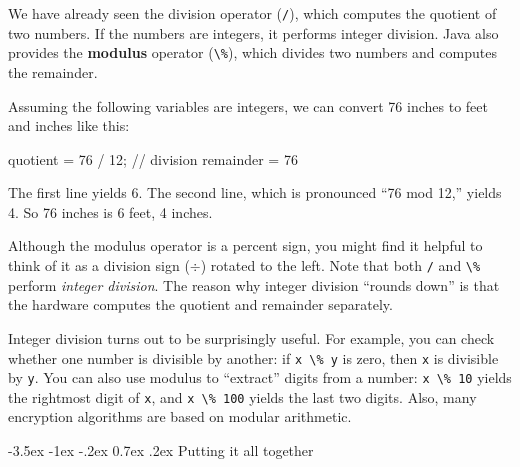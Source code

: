 \documentclass[12pt]{book}
\makeatletter
\theoremstyle{exercise}
\newcommand{\java}[1]{\verb"#1"}
\renewcommand{\section}{\@startsection {section}{1}{\z@}%
    {-3.5ex \@plus -1ex \@minus -.2ex}%
    {0.7ex \@plus.2ex}%
    {\normalfont\Large\bfseries}}
\newcommand{\java}[1]{\lstinline{#1}} %
\makeatother
\begin{document}
We have already seen the division operator (\java{/}), which computes the quotient of two numbers.
If the numbers are integers, it performs integer division.
Java also provides the {\bf modulus} operator (\java{\%}), which divides two numbers and computes the remainder.

Assuming the following variables are integers, we can convert 76 inches to feet and inches like this:

\begin{code}
    quotient = 76 / 12;   // division
    remainder = 76 %
\end{code}

The first line yields 6.
The second line, which is pronounced ``76 mod 12,'' yields 4.
So 76 inches is 6 feet, 4 inches.

Although the modulus operator is a percent sign, you might find it helpful to think of it as a division sign ($\div$) rotated to the left.
Note that both \java{/} and \java{\%} perform {\em integer division}.
The reason why integer division ``rounds down'' is that the hardware computes the quotient and remainder separately.


Integer division turns out to be surprisingly useful.
For example, you can check whether one number is divisible by another: if \java{x \% y} is zero, then \java{x} is divisible by \java{y}.
You can also use modulus to ``extract'' digits from a number: \java{x \% 10} yields the rightmost digit of \java{x}, and \java{x \% 100} yields the last two digits.
Also, many encryption algorithms are based on modular arithmetic.


\section{Putting it all together}



\end{document}
